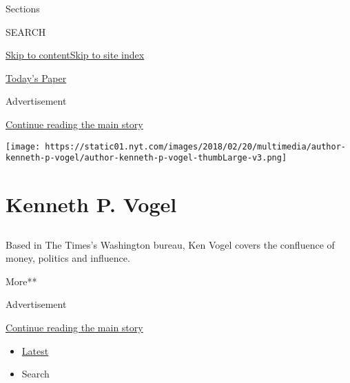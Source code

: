 Sections

SEARCH

\protect\hyperlink{site-content}{Skip to
content}\protect\hyperlink{site-index}{Skip to site index}

\href{https://myaccount.nytimes.com/auth/login?response_type=cookie\&client_id=vi}{}

\href{https://www.nytimes.com/section/todayspaper}{Today's Paper}

Advertisement

\protect\hyperlink{after-top}{Continue reading the main story}

\texttt{[image: https://static01.nyt.com/images/2018/02/20/multimedia/author-kenneth-p-vogel/author-kenneth-p-vogel-thumbLarge-v3.png]}

\hypertarget{kenneth-p-vogel}{%
\section{Kenneth P. Vogel}\label{kenneth-p-vogel}}

\subsection{}

Based in The Times's Washington bureau, Ken Vogel covers the confluence
of money, politics and influence.

More**

Advertisement

\protect\hyperlink{after-mid1}{Continue reading the main story}

\begin{itemize}
\tightlist
\item
  \protect\hyperlink{stream-panel}{Latest}
\item
  Search
\end{itemize}


